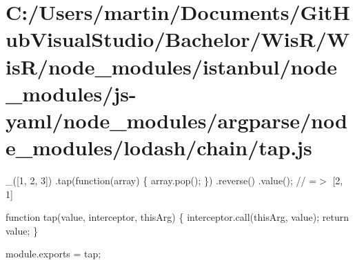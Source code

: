 \hypertarget{_c_1_2_users_2martin_2_documents_2_git_hub_visual_studio_2_bachelor_2_wis_r_2_wis_r_2node_module0d28211e20e702eaefebeaf4d7e055f0}{}\section{C\+:/\+Users/martin/\+Documents/\+Git\+Hub\+Visual\+Studio/\+Bachelor/\+Wis\+R/\+Wis\+R/node\+\_\+modules/istanbul/node\+\_\+modules/js-\/yaml/node\+\_\+modules/argparse/node\+\_\+modules/lodash/chain/tap.\+js}
\+\_\+(\mbox{[}1, 2, 3\mbox{]}) .tap(function(array) \{ array.\+pop(); \}) .reverse() .value(); // =$>$ \mbox{[}2, 1\mbox{]}


\begin{DoxyCodeInclude}

\textcolor{keyword}{function} tap(value, interceptor, thisArg) \{
  interceptor.call(thisArg, value);
  \textcolor{keywordflow}{return} value;
\}

module.exports = tap;
\end{DoxyCodeInclude}
 